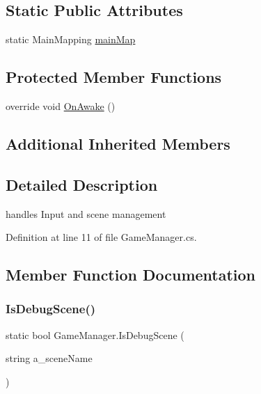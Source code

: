 \subsection*{Static Public Attributes}
\begin{DoxyCompactItemize}
\item 
static Main\+Mapping \mbox{\hyperlink{class_game_manager_ad6ae4c20fbf43657dfb819caf38df783}{main\+Map}}
\end{DoxyCompactItemize}
\subsection*{Protected Member Functions}
\begin{DoxyCompactItemize}
\item 
override void \mbox{\hyperlink{class_game_manager_a30d19f2d0dbdc657e6f216a99e4be4af}{On\+Awake}} ()
\end{DoxyCompactItemize}
\subsection*{Additional Inherited Members}


\subsection{Detailed Description}
handles Input and scene management 



Definition at line 11 of file Game\+Manager.\+cs.



\subsection{Member Function Documentation}
\mbox{\label{class_game_manager_a746715f95f49db4565a3c52235021656}} 
\subsubsection{\texorpdfstring{Is\+Debug\+Scene()}{IsDebugScene()}}
{\footnotesize\ttfamily static bool Game\+Manager.\+Is\+Debug\+Scene (\begin{DoxyParamCaption}\item[{string}]{a\+\_\+scene\+Name }\end{DoxyParamCaption})\hspace{0.3cm}{\ttfamily [static]}}



